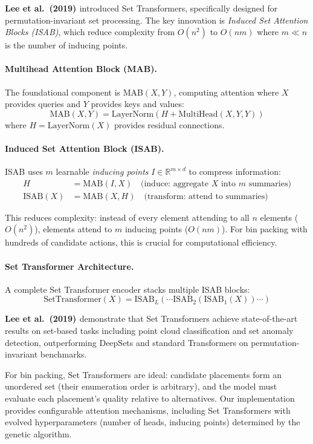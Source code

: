 \textbf{Lee et al.\ (2019) \cite{LHS+19}} introduced Set Transformers, specifically designed for permutation-invariant set processing. The key innovation is \textit{Induced Set Attention Blocks (ISAB)}, which reduce complexity from $O(n^2)$ to $O(nm)$ where $m \ll n$ is the number of inducing points.

\paragraph{Multihead Attention Block (MAB).}
The foundational component is MAB$(X, Y)$, computing attention where $X$ provides queries and $Y$ provides keys and values:
\[
\text{MAB}(X, Y) = \text{LayerNorm}\left(H + \text{MultiHead}(X, Y, Y)\right)
\]
where $H = \text{LayerNorm}(X)$ provides residual connections.

\paragraph{Induced Set Attention Block (ISAB).}
ISAB uses $m$ learnable \textit{inducing points} $I \in \mathbb{R}^{m \times d}$ to compress information:
\begin{align*}
H &= \text{MAB}(I, X) \quad \text{(induce: aggregate $X$ into $m$ summaries)} \\
\text{ISAB}(X) &= \text{MAB}(X, H) \quad \text{(transform: attend to summaries)}
\end{align*}

This reduces complexity: instead of every element attending to all $n$ elements ($O(n^2)$), elements attend to $m$ inducing points ($O(nm)$). For bin packing with hundreds of candidate actions, this is crucial for computational efficiency.

\paragraph{Set Transformer Architecture.}
A complete Set Transformer encoder stacks multiple ISAB blocks:
\[
\text{SetTransformer}(X) = \text{ISAB}_L(\cdots \text{ISAB}_2(\text{ISAB}_1(X)) \cdots)
\]

\textbf{Lee et al.\ (2019) \cite{LHS+19}} demonstrate that Set Transformers achieve state-of-the-art results on set-based tasks including point cloud classification and set anomaly detection, outperforming DeepSets and standard Transformers on permutation-invariant benchmarks.

For bin packing, Set Transformers are ideal: candidate placements form an unordered set (their enumeration order is arbitrary), and the model must evaluate each placement's quality relative to alternatives. Our implementation provides configurable attention mechanisms, including Set Transformers with evolved hyperparameters (number of heads, inducing points) determined by the genetic algorithm.

